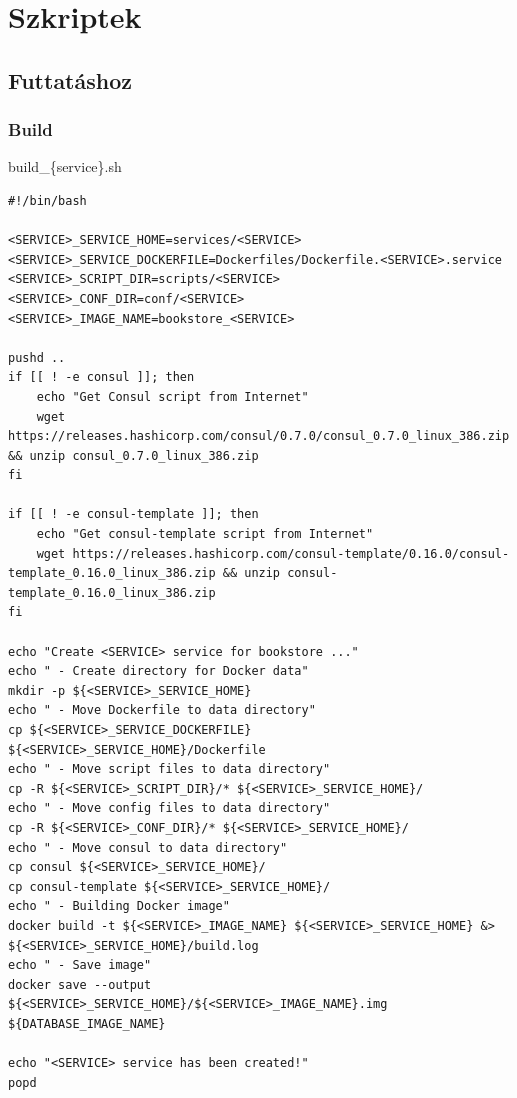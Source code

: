 \documentclass[11pt,magyar,a4paper,twoside,]{report}
\begin{document}
\section{Szkriptek}\label{szkriptek}

\subsection{Futtatáshoz}\label{futtatuxe1shoz}

\subsubsection{Build}\label{build}

build\_\{service\}.sh

\begin{verbatim}
#!/bin/bash

<SERVICE>_SERVICE_HOME=services/<SERVICE>
<SERVICE>_SERVICE_DOCKERFILE=Dockerfiles/Dockerfile.<SERVICE>.service
<SERVICE>_SCRIPT_DIR=scripts/<SERVICE>
<SERVICE>_CONF_DIR=conf/<SERVICE>
<SERVICE>_IMAGE_NAME=bookstore_<SERVICE>

pushd ..
if [[ ! -e consul ]]; then
    echo "Get Consul script from Internet"
    wget https://releases.hashicorp.com/consul/0.7.0/consul_0.7.0_linux_386.zip && unzip consul_0.7.0_linux_386.zip
fi

if [[ ! -e consul-template ]]; then
    echo "Get consul-template script from Internet"
    wget https://releases.hashicorp.com/consul-template/0.16.0/consul-template_0.16.0_linux_386.zip && unzip consul-template_0.16.0_linux_386.zip
fi

echo "Create <SERVICE> service for bookstore ..."
echo " - Create directory for Docker data"
mkdir -p ${<SERVICE>_SERVICE_HOME}
echo " - Move Dockerfile to data directory"
cp ${<SERVICE>_SERVICE_DOCKERFILE} ${<SERVICE>_SERVICE_HOME}/Dockerfile
echo " - Move script files to data directory"
cp -R ${<SERVICE>_SCRIPT_DIR}/* ${<SERVICE>_SERVICE_HOME}/
echo " - Move config files to data directory"
cp -R ${<SERVICE>_CONF_DIR}/* ${<SERVICE>_SERVICE_HOME}/
echo " - Move consul to data directory"
cp consul ${<SERVICE>_SERVICE_HOME}/
cp consul-template ${<SERVICE>_SERVICE_HOME}/
echo " - Building Docker image"
docker build -t ${<SERVICE>_IMAGE_NAME} ${<SERVICE>_SERVICE_HOME} &> ${<SERVICE>_SERVICE_HOME}/build.log
echo " - Save image"
docker save --output ${<SERVICE>_SERVICE_HOME}/${<SERVICE>_IMAGE_NAME}.img ${DATABASE_IMAGE_NAME}

echo "<SERVICE> service has been created!"
popd
\end{verbatim}
\end{document}
